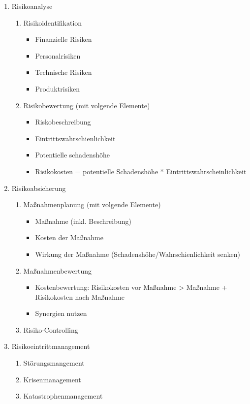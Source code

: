 \documentclass[11pt,a4paper]{article}
\begin{document}
\begin{enumerate}

\item Risikoanalyse
	\begin{enumerate}
	\item Risikoidentifikation
		\begin{itemize}
		\item Finanzielle Risiken
		\item Personalrisiken
		\item Technische Risiken
		\item Produktrisiken
		\end{itemize}
	\item Risikobewertung (mit volgende Elemente)
		\begin{itemize}
		\item Riskobeschreibung
		\item Eintrittswahrschienlichkeit
		\item Potentielle schadenshöhe
		\item Risikokosten = potentielle Schadenshöhe * Eintrittswahrscheinlichkeit
		\end{itemize}	
	\end{enumerate}
	
\item Risikoabsicherung
	\begin{enumerate}
	\item Maßnahmenplanung (mit volgende Elemente)
		\begin{itemize}
		\item Maßnahme (inkl. Beschreibung)
		\item Kosten der Maßnahme
		\item Wirkung der Maßnahme (Schadenshöhe/Wahrschienlichkeit senken)
		\end{itemize}
		
	\item Maßnahmenbewertung
		\begin{itemize}
		\item Kostenbewertung: Risikokosten vor Maßnahme > Maßnahme + Risikokosten nach Maßnahme
		\item Synergien nutzen
		\end{itemize}
	
	\item Risiko-Controlling
	\end{enumerate}

\item Risikoeintrittmanagement
	\begin{enumerate}
	\item Störungsmangement
	
	\item Krisenmanagement
	
	\item Katastrophenmanagement
	\end{enumerate}

\end{enumerate}
\end{document}
